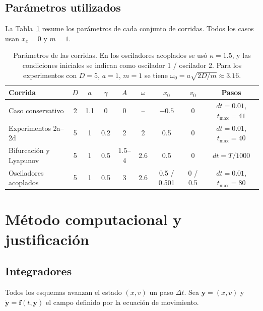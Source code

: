 \documentclass[12pt,a4paper]{article}
\begin{document}
\subsection{Parámetros utilizados}

La Tabla~\ref{tab:param} resume los parámetros de cada conjunto de corridas. Todos los casos usan $x_e=0$ y $m=1$.

\begin{table}[H]
\centering
\footnotesize
\setlength{\tabcolsep}{3pt}
\begin{tabular}{@{}lcccccccc@{}}
\toprule
Corrida & $D$ & $a$ & $\gamma$ & $A$ & $\omega$ & $x_0$ & $v_0$ & Pasos\\
\midrule
Caso conservativo & 2 & 1.1 & 0 & 0 & -- & $-0.5$ & 0 & $dt=0.01$, $t_{\max}=41$\\
Experimentos 2a--2d & 5 & 1 & 0.2 & 2 & 2 & 0.5 & 0 & $dt=0.01$, $t_{\max}=40$\\
Bifurcación y Lyapunov & 5 & 1 & 0.5 & 1.5--4 & 2.6 & 0.5 & 0 & $dt=T/1000$\\
Osciladores acoplados & 5 & 1 & 0.5 & 3 & 2.6 & 0.5 / 0.501 & 0 / 0.5 & $dt=0.01$, $t_{\max}=80$\\
\bottomrule
\end{tabular}
\caption{Parámetros de las corridas. En los osciladores acoplados se usó $\kappa=1.5$, y las condiciones iniciales se indican como oscilador 1 / oscilador 2. Para los experimentos con $D=5$, $a=1$, $m=1$ se tiene $\omega_0=a\sqrt{2D/m}\approx 3.16$.}
\label{tab:param}
\end{table}

\section{Método computacional y justificación}

\subsection{Integradores}

Todos los esquemas avanzan el estado $(x,v)$ un paso $\Delta t$. Sea $\mathbf{y}=(x,v)$ y $\dot{\mathbf y}=\mathbf{f}(t,\mathbf{y})$ el campo definido por la ecuación de movimiento.
\end{document}
